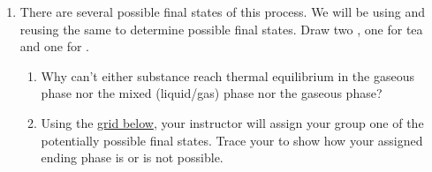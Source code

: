 \begin{enumerate}
	\item There are several possible final states of this process. We will be using and reusing the same \ThreePhaseModel{} to determine possible final states. Draw two \TempGraphs{}, one for tea and one for .
	\begin{enumerate}
		\item Why can't either substance reach thermal equilibrium in the gaseous phase nor the mixed (liquid/gas) phase nor the gaseous phase?
		\item Using the \hyperref[act123-grid]{grid below}, your instructor will assign your group one of the potentially possible final states. Trace your \TempGraph{} to show how your assigned ending phase is or is not possible.
		\label{act123-gridprob}
	\end{enumerate}


\end{enumerate}
